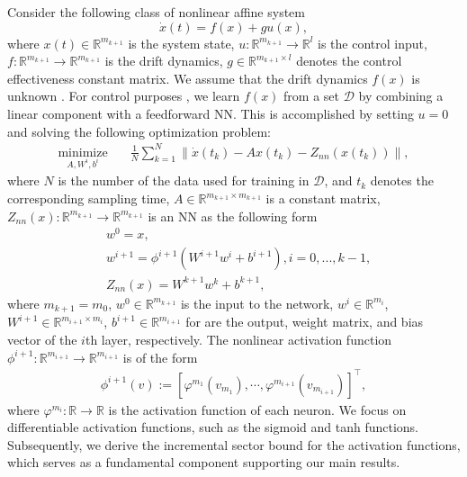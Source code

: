 \documentclass[journal,twoside,web]{ieeecolor}
\begin{document}
Consider the following class of nonlinear affine system
 \begin{equation}\label{ND0}
\dot{x}(t)=f(x)+gu(x),
\end{equation}
where $x(t)\in \mathbb{R}^{m_{k+1}}$ is the system state, $u:\mathbb{R}^{m_{k+1}}\rightarrow\mathbb{R}^l$ is the control input, $f:\mathbb{R}^{m_{k+1}}\rightarrow \mathbb{R}^{m_{k+1}}$ is the drift dynamics, $g\in\mathbb{R}^{m_{k+1}\times l}$ denotes the control effectiveness constant matrix. We assume that the drift dynamics $f(x)$ is unknown \cite{greene2022approximate,greene2023deep}. For control purposes \cite{de2023learning, martinelli2023unconstrained}, we learn $f(x)$ from a set $\mathcal{D}$ by combining a linear component with a feedforward NN. This is accomplished by setting $u=0$ and solving the following optimization problem:
\begin{align}
\underset{A, W^i, b^i}{\text{minimize}}  \quad & \frac{1}{N}\sum_{k=1}^{N} \|\dot{x}(t_k)-Ax(t_k)-Z_{nn}(x(t_k))\|,\label{aca}
\end{align}
where $N$ is the number of the data used for training in $\mathcal{D}$, and $t_k$ denotes the corresponding sampling time, $A\in \mathbb{R}^{m_{k+1}\times m_{k+1}}$ is a constant matrix, $Z_{nn}(x):\mathbb{R}^{m_{k+1}}\rightarrow \mathbb{R}^{m_{k+1}}$ is an NN as the following form
\begin{equation}\label{NN}
 \begin{aligned}
&w^0=x,
\\&w^{i+1}=\phi^{i+1}(W^{i+1}w^{i}+b^{i+1}), i=0,...,k-1,
\\&Z_{nn}(x)=W^{k+1}w^{k}+b^{k+1},
\end{aligned}
\end{equation}
where $m_{k+1}=m_0$, $w^0\in \mathbb{R}^{m_{k+1}}$ is the input to the network, $w^{i}\in\mathbb{R}^{m_{i}}$, $W^{i+1}\in \mathbb{R}^{{m_{i+1}}\times m_{i}}$, $b^{i+1}\in \mathbb{R}^{m_{i+1}}$ for are the output, weight matrix, and bias vector of the $i$th layer, respectively. The nonlinear activation function $\phi^{i+1}:\mathbb{R}^{m_{i+1}}\rightarrow \mathbb{R}^{m_{i+1}}$ is of the form
\begin{equation}\label{NNa}
 \begin{aligned}
\phi^{i+1}(v):=[\varphi^{m_1}(v_{m_1}),\cdots,\varphi^{m_{i+1}}(v_{m_{i+1}})]^{\top},
\end{aligned}
\end{equation}
where $\varphi^{m_i}: \mathbb{R}\rightarrow \mathbb{R}$ is the activation function of each neuron. We focus on differentiable activation functions, such as the sigmoid and tanh functions. Subsequently, we derive the incremental sector bound for the activation functions, which serves as a fundamental component supporting our main results.
\end{document}
